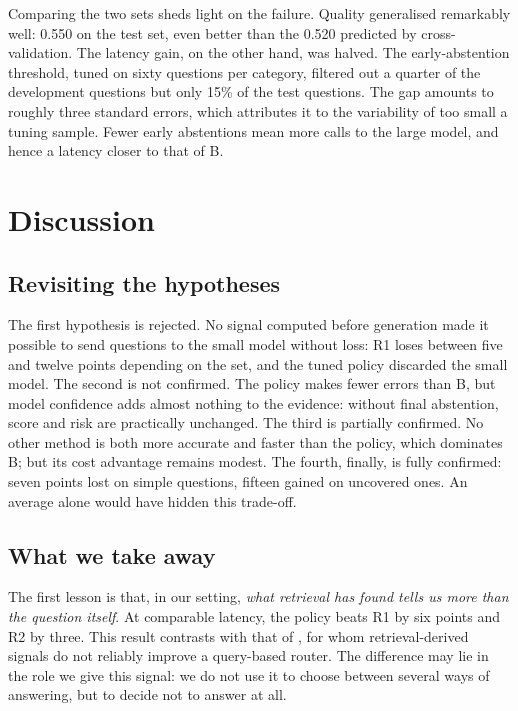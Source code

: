 \documentclass[11pt,a4paper]{article}
\begin{document}
Comparing the two sets sheds light on the failure. Quality generalised remarkably well: 0.550 on the test
set, even better than the 0.520 predicted by cross-validation. The latency gain, on the other hand, was
halved. The early-abstention threshold, tuned on sixty questions per category, filtered out a quarter of
the development questions but only 15\% of the test questions. The gap amounts to roughly three standard
errors, which attributes it to the variability of too small a tuning sample. Fewer early abstentions mean
more calls to the large model, and hence a latency closer to that of B.

\section{Discussion}\label{sec:discussion}

\subsection{Revisiting the hypotheses}

The first hypothesis is rejected. No signal computed before generation made it possible to send
questions to the small model without loss: R1 loses between five and twelve points depending on the set,
and the tuned policy discarded the small model. The second is not confirmed. The policy makes fewer
errors than B, but model confidence adds almost nothing to the evidence: without final abstention, score
and risk are practically unchanged. The third is partially confirmed. No other method is both more
accurate and faster than the policy, which dominates B; but its cost advantage remains modest. The
fourth, finally, is fully confirmed: seven points lost on simple questions, fifteen gained on uncovered
ones. An average alone would have hidden this trade-off.

\subsection{What we take away}

The first lesson is that, in our setting, \emph{what retrieval has found tells us more than the question
itself}. At comparable latency, the policy beats R1 by six points and R2 by three. This result contrasts
with that of \citet{li2026beyond}, for whom retrieval-derived signals do not reliably improve a
query-based router. The difference may lie in the role we give this signal: we do not use it to choose
between several ways of answering, but to decide not to answer at all.
\end{document}
